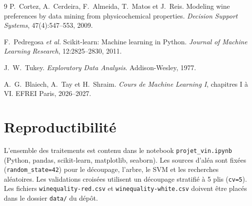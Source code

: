 \documentclass[11pt,a4paper]{article}
\newcommand{\code}[1]{\texttt{#1}}
\begin{document}
\begin{thebibliography}{9}
P.~Cortez, A.~Cerdeira, F.~Almeida, T.~Matos et J.~Reis.
\newblock Modeling wine preferences by data mining from physicochemical properties.
\newblock \emph{Decision Support Systems}, 47(4):547--553, 2009.

F.~Pedregosa \emph{et al.}
\newblock Scikit-learn: Machine learning in Python.
\newblock \emph{Journal of Machine Learning Research}, 12:2825--2830, 2011.

J.~W.~Tukey.
\newblock \emph{Exploratory Data Analysis}.
\newblock Addison-Wesley, 1977.

A.~G.~Blaiech, A.~Tay et H.~Shraim.
\newblock \emph{Cours de Machine Learning I}, chapitres I à VI.
\newblock EFREI Paris, 2026--2027.
\end{thebibliography}

\appendix
\section{Reproductibilité}
L'ensemble des traitements est contenu dans le notebook \code{projet\_vin.ipynb} (Python, pandas, scikit-learn, matplotlib, seaborn). Les sources d'aléa sont fixées (\code{random\_state=42}) pour le découpage, l'arbre, le SVM et les recherches aléatoires. Les validations croisées utilisent un découpage stratifié à 5 plis (\code{cv=5}). Les fichiers \code{winequality-red.csv} et \code{winequality-white.csv} doivent être placés dans le dossier \code{data/} du dépôt.
\end{document}
